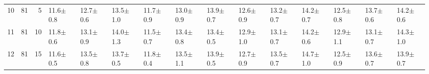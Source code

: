 \begin{table}[ht]
{\begin{tabular}{rrrllllllllllll}
   \hline
10 &  81 &   5 & 11.6$\pm$0.8 & 12.7$\pm$0.6 & 13.5$\pm$1.0 & 11.7$\pm$0.9 & 13.0$\pm$0.9 & 13.9$\pm$0.7 & 12.6$\pm$0.9 & 13.2$\pm$0.7 & 14.2$\pm$0.7 & 12.5$\pm$0.8 & 13.7$\pm$0.6 & 14.2$\pm$0.6 \\ 
  11 &  81 &  10 & 11.8$\pm$0.6 & 13.1$\pm$0.9 & 14.0$\pm$1.3 & 11.5$\pm$0.7 & 13.4$\pm$0.8 & 13.4$\pm$0.5 & 12.9$\pm$1.0 & 13.1$\pm$0.7 & 14.2$\pm$0.6 & 12.9$\pm$1.1 & 13.1$\pm$0.7 & 14.3$\pm$1.0 \\ 
  12 &  81 &  15 & 11.6$\pm$0.5 & 13.5$\pm$0.8 & 13.7$\pm$0.5 & 11.8$\pm$0.4 & 13.5$\pm$1.1 & 13.9$\pm$0.5 & 12.7$\pm$0.9 & 13.5$\pm$0.7 & 14.7$\pm$1.0 & 12.5$\pm$0.9 & 13.6$\pm$0.7 & 13.9$\pm$0.7 \\ 
   \hline
\end{tabular}
}
\end{table}
